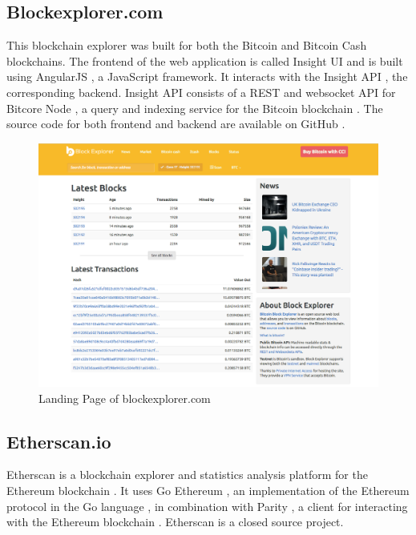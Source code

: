 \subsection{Blockexplorer.com \cite{blockexplorer}}
This blockchain explorer was built for both the Bitcoin \cite{bitcoin} and Bitcoin Cash \cite{bitcoincash} blockchains. The frontend of the web application is called Insight UI \cite{insightui} and is built using AngularJS \cite{angular}, a JavaScript \cite{javascript} framework. It interacts with the Insight API \cite{insightapi}, the corresponding backend. Insight API consists of a REST and websocket API for Bitcore Node \cite{bitcorenode}, a query and indexing service for the Bitcoin blockchain \cite{bitcoin}. The source code for both frontend and backend are available on GitHub \cite{insightui} \cite{insightapi}.

\begin{figure}
  \includegraphics[width=\linewidth]{blockexplorer.png}
  \caption{Landing Page of blockexplorer.com \cite{blockexplorer}}
  \label{fig:blockexplorer1}
\end{figure}

\subsection{Etherscan.io \cite{etherscan}}
Etherscan is a blockchain explorer and statistics analysis platform for the Ethereum blockchain \cite{ethereum}. It uses Go Ethereum \cite{goethereum}, an implementation of the Ethereum protocol in the Go language \cite{golang}, in combination with Parity \cite{parity}, a client for interacting with the Ethereum blockchain \cite{ethereum}. Etherscan is a closed source project.

